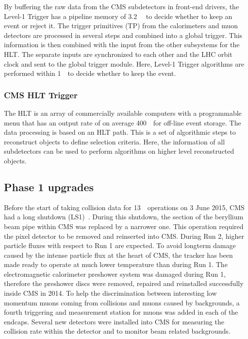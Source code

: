 By buffering the raw data from the CMS subdetectors in front-end drivers, the Level-1 Trigger has a pipeline memory of 3.2~ \micro \second\ to decide whether to keep an event or reject it. 
The trigger primitives (TP) from the calorimeters and muon detectors are processed in several steps and combined into a global trigger. This information is then combined with the input from the other subsystems for the HLT. The separate inputs are synchronized to each other and the LHC orbit clock and sent to the global trigger module. Here, Level-1 Trigger algorithms are performed within 1~\micro \second\ to decide whether to  keep the event. 


\subsubsection*{CMS HLT Trigger}
The HLT is an array of commercially available computers with a programmable menu that has an output rate of on average 400~\hertz\ for off-line event storage.
The data processing is based on an HLT path. This is a  set of algorithmic steps to reconstruct objects to define selection criteria.  Here, the information of all subdetectors can be used to perform algorithms on higher level reconstructed objects. 

\subsection{Phase 1 upgrades}
\label{sec:Phase1}
Before the start of taking collision data for 13~\TeV\ operations on 3 June 2015, CMS had a long shutdown (LS1)~\cite{Pralavorio:2024977}. During this shutdown, the section of the beryllium beam pipe within CMS was replaced by a narrower one. This operation required the pixel detector to be  removed and reinserted into CMS. During Run 2, higher particle fluxes with respect to Run 1 are expected. To avoid longterm damage caused by the intense particle flux at the heart of CMS, the tracker has been made ready to operate at much lower temperature than during Run 1.  The electromagnetic calorimeter preshower system was damaged during Run 1, therefore the preshower discs were removed, repaired and reinstalled successfully inside CMS in 2014. To help the discrimination between interesting low momentum muons coming from collisions and muons caused by backgrounds, a fourth triggering and measurement station for muons was added in each of the endcaps. Several new detectors were installed into CMS for measuring the collision rate within the detector and to monitor beam related backgrounds. 

